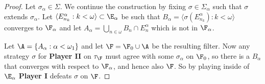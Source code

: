 \documentclass{article}
\begin{document}
\begin{proof}
Let \(\sigma_{\alpha} \in \Sigma\). We continue the construction by fixing \(\sigma \in \Sigma_{\alpha}\) such that \(\sigma\) extends \(\sigma_{\alpha}\). Let \(\langle E_{n_k}^{\alpha}: k < \omega \rangle \subset \E_{\alpha}\) be such that \(B_{\alpha} = \langle \sigma(E_{n_k}^{\alpha}): k < \omega \rangle\) converges to \(\F_{\alpha}\) and let \(A_{\alpha} = \bigcup_{n \in \omega}B_n \cap E_n^{\alpha}\) which is not in \(\F_{\alpha}\).

Let \(\A = \{A_{\alpha}:\alpha < \omega_1\}\) and let \(\F = \F_0\cup\A\) be the resulting filter. Now any strategy \(\sigma\) for \textbf{Player II} on \(\tau_{\F}\) must agree with some \(\sigma_{\alpha}\) on \(\F_0\), so there is a \(B_{\alpha}\) that converges with respect to \(\F_{\alpha}\), and hence also \(\F\). So by playing inside of \(\E_{\alpha}\) \textbf{Player I} defeats \(\sigma\) on \(\F\).

\end{proof}
\end{document}
